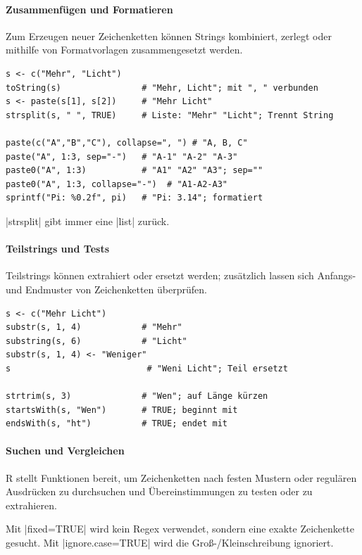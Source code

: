 \documentclass[10pt,twocolumn]{scrartcl}
\renewcommand{\lstinline}{\mycoloredinline}
\begin{document}
\paragraph{Zusammenfügen und Formatieren}

Zum Erzeugen neuer Zeichenketten können Strings kombiniert, zerlegt oder mithilfe von Formatvorlagen zusammengesetzt werden.

\begin{lstlisting}
s <- c("Mehr", "Licht")
toString(s)                # "Mehr, Licht"; mit ", " verbunden
s <- paste(s[1], s[2])     # "Mehr Licht"
strsplit(s, " ", TRUE)     # Liste: "Mehr" "Licht"; Trennt String

paste(c("A","B","C"), collapse=", ") # "A, B, C"
paste("A", 1:3, sep="-")   # "A-1" "A-2" "A-3"
paste0("A", 1:3)           # "A1" "A2" "A3"; sep=""
paste0("A", 1:3, collapse="-")  # "A1-A2-A3"
sprintf("Pi: %0.2f", pi)   # "Pi: 3.14"; formatiert
\end{lstlisting}

\lstinline|strsplit| gibt immer eine \lstinline|list| zurück.

\paragraph{Teilstrings und Tests}

Teilstrings können extrahiert oder ersetzt werden; zusätzlich lassen sich Anfangs- und Endmuster von Zeichenketten überprüfen.

\begin{lstlisting}
s <- c("Mehr Licht")
substr(s, 1, 4)            # "Mehr"
substring(s, 6)            # "Licht"
substr(s, 1, 4) <- "Weniger"
s                           # "Weni Licht"; Teil ersetzt

strtrim(s, 3)              # "Wen"; auf Länge kürzen
startsWith(s, "Wen")       # TRUE; beginnt mit
endsWith(s, "ht")          # TRUE; endet mit
\end{lstlisting}

\paragraph{Suchen und Vergleichen}

R stellt Funktionen bereit, um Zeichenketten nach festen Mustern oder regulären Ausdrücken zu durchsuchen und Übereinstimmungen zu testen oder zu extrahieren.

Mit \lstinline|fixed=TRUE| wird kein Regex verwendet, sondern eine exakte Zeichenkette gesucht.
Mit \lstinline|ignore.case=TRUE| wird die Groß-/Kleinschreibung ignoriert.
\end{document}
